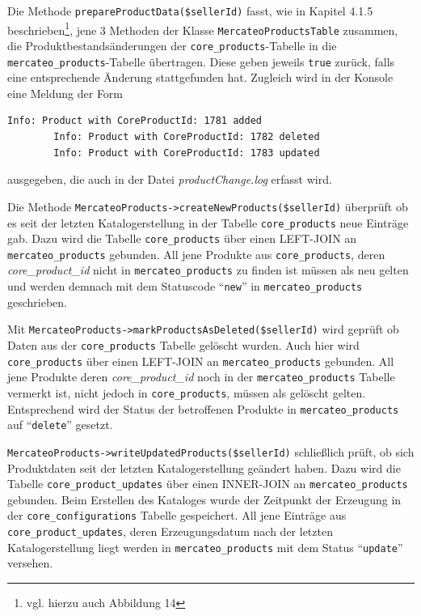 {	Die Methode \texttt{prepareProductData(\$sellerId)} fasst, wie in Kapitel 4.1.5 beschrieben\footnote{vgl. hierzu auch Abbildung 14}, jene 3 Methoden der Klasse \texttt{MercateoProductsTable} zusammen, die Produktbestandsänderungen der \texttt{core\_products}-Tabelle in die \texttt{mercateo\_products}-Tabelle übertragen. 
	Diese geben jeweils \texttt{true} zurück, falls eine entsprechende Änderung stattgefunden hat. Zugleich wird in der Konsole eine Meldung der Form 	
		\begin{lstlisting}[caption={Konsolenausgabe bei der Transaktion T\_UPDATE\_PRODUCTS}]
		Info: Product with CoreProductId: 1781 added
		Info: Product with CoreProductId: 1782 deleted
		Info: Product with CoreProductId: 1783 updated
		\end{lstlisting} ausgegeben, die auch in der Datei \textit{productChange.log} erfasst wird.
	
	Die Methode \texttt{MercateoProducts->createNewProducts(\$sellerId)} überprüft ob es seit der letzten Katalogerstellung in der Tabelle \texttt{core\_products} neue Einträge gab. Dazu wird die Tabelle \texttt{core\_products} über einen LEFT-JOIN an \texttt{mercateo\_products}  gebunden. All jene Produkte aus \texttt{core\_products}, deren \textit{core\_product\_id} nicht in \texttt{mercateo\_products} zu finden ist müssen als neu gelten und werden demnach mit dem Statuscode \enquote{\texttt{new}} in \texttt{mercateo\_products} geschrieben. 
	
	Mit \texttt{MercateoProducts->markProductsAsDeleted(\$sellerId)} wird geprüft ob Daten aus der \texttt{core\_products} Tabelle gelöscht wurden. Auch hier wird \texttt{core\_products} über einen LEFT-JOIN an \texttt{mercateo\_products} gebunden. All jene Produkte deren \textit{core\_product\_id} 
	noch in der \texttt{mercateo\_products} Tabelle vermerkt ist, nicht jedoch in \texttt{core\_products}, müssen als gelöscht gelten. Entsprechend wird der Status der betroffenen Produkte in \texttt{mercateo\_products} auf \enquote{\texttt{delete}} gesetzt.
	
	\texttt{MercateoProducts->writeUpdatedProducts(\$sellerId)} schließlich prüft, ob sich Produktdaten seit der letzten Katalogerstellung geändert haben. Dazu wird die Tabelle \texttt{core\_product\_updates} über einen INNER-JOIN an \texttt{mercateo\_products} gebunden.
	Beim Erstellen des Kataloges wurde der Zeitpunkt der Erzeugung in der \texttt{core\_configurations} Tabelle gespeichert. All jene Einträge aus \texttt{core\_product\_updates}, deren Erzeugungsdatum nach der letzten Katalogerstellung liegt werden in \texttt{mercateo\_products} mit dem Status \enquote{\texttt{update}} versehen.
	
}

